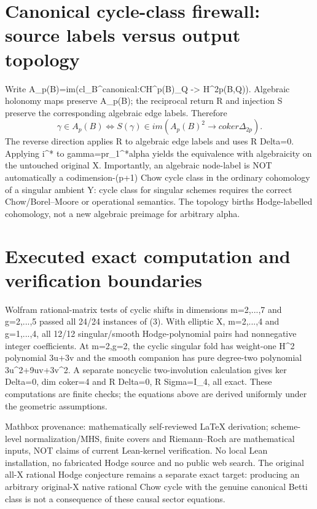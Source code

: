 \documentclass[11pt]{article}
\begin{document}
\section{Canonical cycle-class firewall: source labels versus output topology}
Write A_p(B)=im(cl_B^{canonical}:CH^p(B)_Q -> H^{2p}(B,Q)). Algebraic holonomy maps preserve A_p(B); the reciprocal return R and injection S preserve the corresponding algebraic edge labels. Therefore
\[
\boxed{\gamma\in A_p(B)
\iff
S(\gamma)\in im(A_p(B)^2\to coker\Delta_{2p}).}
\tag{12}
\]
The reverse direction applies R to algebraic edge labels and uses R Delta=0. Applying i^* to gamma=pr_1^*alpha yields the equivalence with algebraicity on the untouched original X. Importantly, an algebraic node-label is NOT automatically a codimension-(p+1) Chow cycle class in the ordinary cohomology of a singular ambient Y: cycle class for singular schemes requires the correct Chow/Borel--Moore or operational semantics. The topology births Hodge-labelled cohomology, not a new algebraic preimage for arbitrary alpha.

\section{Executed exact computation and verification boundaries}
Wolfram rational-matrix tests of cyclic shifts in dimensions m=2,...,7 and g=2,...,5 passed all 24/24 instances of (3). With elliptic X, m=2,...,4 and g=1,...,4, all 12/12 singular/smooth Hodge-polynomial pairs had nonnegative integer coefficients. At m=2,g=2, the cyclic singular fold has weight-one H^2 polynomial 3u+3v and the smooth companion has pure degree-two polynomial 3u^2+9uv+3v^2. A separate noncyclic two-involution calculation gives ker Delta=0, dim coker=4 and R Delta=0, R Sigma=I_4, all exact. These computations are finite checks; the equations above are derived uniformly under the geometric assumptions.

Mathbox provenance: mathematically self-reviewed LaTeX derivation; scheme-level normalization/MHS, finite covers and Riemann--Roch are mathematical inputs, NOT claims of current Lean-kernel verification. No local Lean installation, no fabricated Hodge source and no public web search. The original all-X rational Hodge conjecture remains a separate exact target: producing an arbitrary original-X native rational Chow cycle with the genuine canonical Betti class is not a consequence of these causal sector equations.
\end{document}
